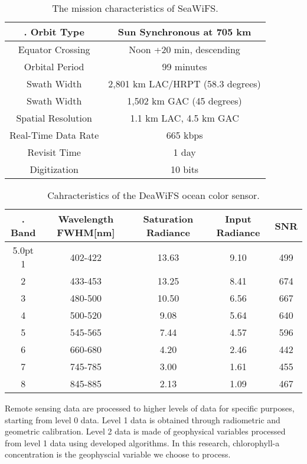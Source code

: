  \begin{table}[h]%
 	\caption{The mission characteristics of SeaWiFS.}
 	\label{table01}
 	\centering
 	\begin{tabular}{c|c}
 		\hline \setlength{\arrayrulewidth}{0.8pt}. 
 	Orbit Type	& Sun Synchronous at 705 km \\ \hline
 	Equator Crossing &	Noon +20 min, descending \\ \hline
 	Orbital Period &	99 minutes  \\ \hline
 	Swath Width &	2,801 km LAC/HRPT (58.3 degrees)  \\ \hline
 	Swath Width &	1,502 km GAC (45 degrees)  \\ \hline
 	Spatial Resolution &	1.1 km LAC, 4.5 km GAC  \\ \hline
 	Real-Time Data Rate &	665 kbps  \\ \hline
 	Revisit Time &	1 day  \\ \hline
 	Digitization &	10 bits  \\ \hline
 	\end{tabular}
 \end{table}

 \begin{table}[h]%
	\caption{Cahracteristics of the DeaWiFS ocean color sensor.}
	\label{table02}
	\centering
	\begin{tabular}{c|c|c|c|c}
		\hline \setlength{\arrayrulewidth}{0.8pt}. 
		Band	& Wavelength FWHM[nm] & Saturation Radiance & Input Radiance & SNR\\ \hline{5.0pt}
		1 & 402-422 & 13.63 & 9.10 & 499 \\ \hline
		2 & 433-453 & 13.25 & 8.41 & 674  \\ \hline
		3 & 480-500 & 10.50 & 6.56 & 667 \\ \hline
		4 & 500-520 & 9.08 & 5.64 & 640  \\ \hline
		5 & 545-565 & 7.44 & 4.57 & 596 \\ \hline
		6 & 660-680 & 4.20 & 2.46 & 442  \\ \hline
		7 & 745-785 & 3.00 & 1.61 & 455 \\ \hline
		8 & 845-885 & 2.13 & 1.09 & 467  \\ \hline
	\end{tabular}
\end{table}
 

 Remote sensing data are processed to higher levels of data for specific purposes, starting from level 0 data. Level 1 data is obtained through radiometric and geometric calibration. Level 2 data is made of geophysical variables processed from level 1 data using developed algorithms. In this research, chlorophyll-a concentration is the geophyscial variable we choose to process. 
 
